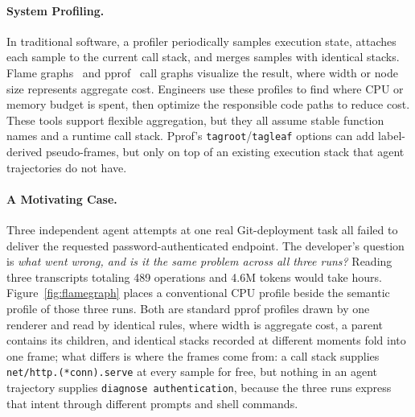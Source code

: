 \documentclass[sigconf,nonacm]{acmart}
\begin{document}
\paragraph{System Profiling.}
In traditional software, a profiler periodically samples execution state, attaches each
sample to the current call stack, and merges samples with identical
stacks.
Flame graphs~\cite{flamegraphs} and pprof~\cite{pprof} call graphs
visualize the result, where width or node size represents aggregate
cost.
Engineers use these profiles to find where CPU or memory budget is spent, then optimize the responsible code paths to reduce cost.
These tools support flexible aggregation, but they all assume
stable function names and a runtime call stack.
Pprof's \texttt{tagroot}/\texttt{tagleaf} options can add
label-derived pseudo-frames, but only on top of an existing execution
stack that agent trajectories do not have.

\paragraph{A Motivating Case.}
Three independent agent attempts at one real Git-deployment task all failed to deliver the requested password-authenticated endpoint.
The developer's question is \emph{what went wrong, and is it the same problem across all three runs?}
Reading three transcripts totaling 489 operations and 4.6M tokens would take hours.
Figure~\ref{fig:flamegraph} places a conventional CPU profile beside the
semantic profile of those three runs.
Both are standard pprof profiles drawn by one renderer and read by identical
rules, where width is aggregate cost, a parent contains its children, and identical
stacks recorded at different moments fold into one frame; what differs is where the frames come from: a call stack supplies \texttt{net/http.(*conn).serve} at every sample for
free, but nothing in an agent trajectory supplies \texttt{diagnose
authentication}, because the three runs express that intent through different
prompts and shell commands.
\end{document}
